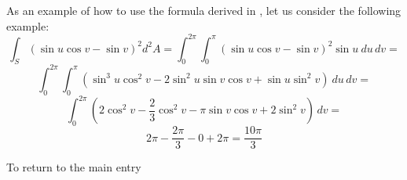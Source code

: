 \documentclass[12pt]{article}
\begin{document}
As an example of how to use the formula derived in , let us consider the following example:
 $$\int_S (\sin u \cos v - \sin v)^2 d^2 A = \int_0^{2 \pi} \int_0^\pi (\sin u \cos v - \sin v)^2 \sin u \> du \, dv =$$
$$\int_0^{2 \pi} \int_0^\pi \left( \sin^3 u \cos^2 v - 2 \sin^2 u \sin v \cos v + \sin u \sin^2 v \right) \> du \, dv =$$
$$\int_0^{2 \pi} \left( 2 \cos^2 v - \frac{2}{3} \cos^2 v - \pi \sin v \cos v  + 2 \sin^2 v \right) \, dv =$$
$$2 \pi - \frac{2 \pi}{3} - 0 + 2 \pi = \frac{10 \pi}{3}$$

To return to the main entry 
\end{document}
